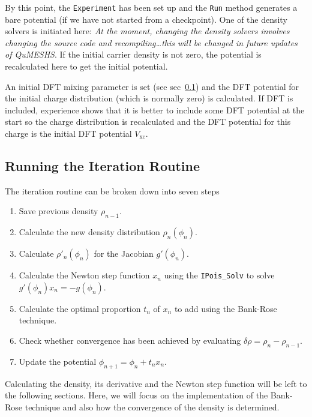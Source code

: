 \documentclass[12pt]{article}
\newcommand{\red}[1]{{\color{red} \it #1}}
\begin{document}
{By this point, the \texttt{Experiment} has been set up and the \texttt{Run} method generates
a bare potential (if we have not started from a checkpoint).  One of the density solvers is
initiated here: \red{At the moment, changing the density solvers involves changing the source
code and recompiling\ldots this will be changed in future updates of QuMESHS}.  If the
initial carrier density is not zero, the potential is recalculated here to get the initial
potential.

An initial DFT mixing parameter is set (see sec~\ref{subsec:IterationRoutine}) and the DFT
potential for the initial charge distribution (which is normally zero) is calculated.  If DFT
is included, experience shows that it is better to include some DFT potential at the start so
the charge distribution is recalculated and the DFT potential for this charge is the initial
DFT potential $V_{\mathrm{xc}}$.


\subsection{Running the Iteration Routine}
\label{subsec:IterationRoutine}

The iteration routine can be broken down into seven steps

\begin{enumerate}
    \item Save previous density $\rho_{n-1}$.
    \item Calculate the new density distribution $\rho_n (\phi_n)$.
    \item Calculate $\rho'_n (\phi_n)$ for the Jacobian $g'(\phi_n)$.
    \item Calculate the Newton step function $x_n$ using the \texttt{IPois\_Solv} to solve
    $g'(\phi_n) x_n = - g(\phi_n)$.
    \item Calculate the optimal proportion $t_n$ of $x_n$ to add using the Bank-Rose technique.
    \item Check whether convergence has been achieved by evaluating $\delta\rho = \rho_n - \rho_{n-1}$.
    \item Update the potential $\phi_{n+1} = \phi_n + t_n x_n$.
\end{enumerate}

Calculating the density, its derivative and the Newton step function will be left to the following
sections.  Here, we will focus on the implementation of the Bank-Rose technique and also how the
convergence of the density is determined.

}
\end{document}
